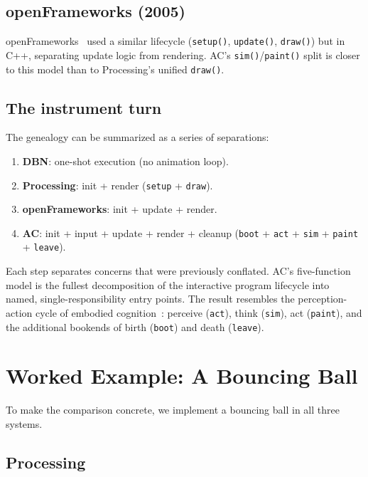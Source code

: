 \documentclass[10pt,letterpaper,twocolumn]{article}
\begin{document}
\subsection{openFrameworks (2005)}

openFrameworks~\citep{openframeworks2005} used a similar lifecycle (\texttt{setup()}, \texttt{update()}, \texttt{draw()}) but in C++, separating update logic from rendering. AC's \texttt{sim()}/\texttt{paint()} split is closer to this model than to Processing's unified \texttt{draw()}.

\subsection{The instrument turn}

The genealogy can be summarized as a series of separations:

\begin{enumerate}
  \item \textbf{DBN}: one-shot execution (no animation loop).
  \item \textbf{Processing}: init + render (\texttt{setup} + \texttt{draw}).
  \item \textbf{openFrameworks}: init + update + render.
  \item \textbf{AC}: init + input + update + render + cleanup (\texttt{boot} + \texttt{act} + \texttt{sim} + \texttt{paint} + \texttt{leave}).
\end{enumerate}

Each step separates concerns that were previously conflated. AC's five-function model is the fullest decomposition of the interactive program lifecycle into named, single-responsibility entry points. The result resembles the perception-action cycle of embodied cognition~\citep{varela1991embodied}: perceive (\texttt{act}), think (\texttt{sim}), act (\texttt{paint}), and the additional bookends of birth (\texttt{boot}) and death (\texttt{leave}).


\section{Worked Example: A Bouncing Ball}
\label{sec:example}

To make the comparison concrete, we implement a bouncing ball in all three systems.

\subsection{Processing}
\end{document}
